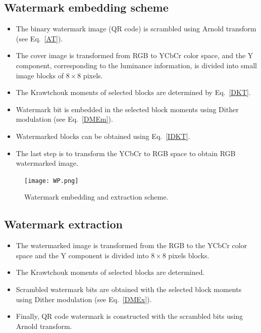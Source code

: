 \documentclass[runningheads]{llncs}
\begin{document}
\subsection*{Watermark embedding scheme}
\begin{itemize}
	\item[\checkmark] The binary watermark image (QR code) is scrambled using Arnold transform (see Eq.~\ref{AT}).
	\item[\checkmark] The cover image is transformed from RGB to YCbCr color space, and the Y component, corresponding to the luminance information, is divided into small image blocks of $8\times 8$ pixels.
	\item[\checkmark] The Krawtchouk moments of selected blocks are determined by Eq.~\ref{DKT}.
	\item[\checkmark] Watermark bit is embedded in the selected block moments using Dither modulation (see Eq.~\ref{DMEm}).
	\item[\checkmark] Watermarked blocks can be obtained using Eq.~\ref{IDKT}.
	\item[\checkmark] The last step is to transform the YCbCr to RGB space to obtain RGB watermarked image.
\end{itemize}
\begin{figure}[H]
	\begin{center}
			\texttt{[image: WP.png]}
	\end{center}
	\caption{Watermark embedding and extraction scheme.}
	\label{PIE}
\end{figure}
\subsection*{Watermark extraction}
\begin{itemize}
	\item[\checkmark] The watermarked image is transformed from the RGB to the YCbCr color space and the Y component is divided into $8\times 8$ pixels blocks.
	\item[\checkmark] The Krawtchouk moments of selected blocks are determined.
	\item[\checkmark] Scrambled watermark bits are obtained with the selected block moments using Dither modulation (see Eq.~\ref{DMEx}).
	\item[\checkmark] Finally, QR code watermark is constructed with the scrambled bits using Arnold transform.
\end{itemize}
\end{document}
